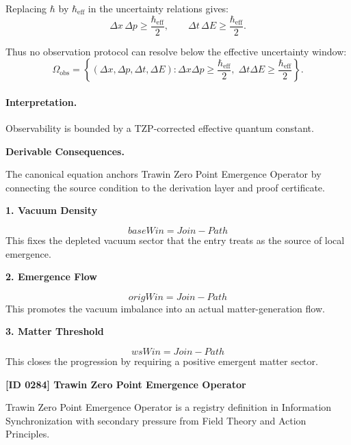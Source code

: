 Replacing $\hbar$ by $\hbar_{\mathrm{eff}}$ in the uncertainty relations gives:
\begin{equation}
\Delta x\,\Delta p
\geq
\frac{\hbar_{\mathrm{eff}}}{2},
\qquad
\Delta t\,\Delta E
\geq
\frac{\hbar_{\mathrm{eff}}}{2}.
\end{equation}

Thus no observation protocol can resolve below the effective uncertainty window:
\begin{equation}
\boxed{
\Omega_{\mathrm{obs}}
=
\left\{
(\Delta x,\Delta p,\Delta t,\Delta E):
\Delta x\Delta p\geq \frac{\hbar_{\mathrm{eff}}}{2},
\;
\Delta t\Delta E\geq \frac{\hbar_{\mathrm{eff}}}{2}
\right\}.
}
\end{equation}

\paragraph{Interpretation.}
Observability is bounded by a TZP-corrected effective quantum constant.

\par\vspace{0.35em}
\noindent\textbf{Derivable Consequences.}\quad
\begingroup
\footnotesize
\raggedright
The canonical equation anchors Trawin Zero Point Emergence Operator by connecting the source condition to the derivation layer and proof certificate.
\par\endgroup

\noindent\textbf{1. Vacuum Density}\par
\[
baseWin = Join-Path
\]
\noindent This fixes the depleted vacuum sector that the entry treats as the source of local emergence.\par
\noindent\textbf{2. Emergence Flow}\par
\[
origWin = Join-Path
\]
\noindent This promotes the vacuum imbalance into an actual matter-generation flow.\par
\noindent\textbf{3. Matter Threshold}\par
\[
wsWin = Join-Path
\]
\noindent This closes the progression by requiring a positive emergent matter sector.\par

\clearpage
\noindent\textbf{[ID 0284] Trawin Zero Point Emergence Operator}\par
\vspace{0.35em}
\begingroup\small
{}
Trawin Zero Point Emergence Operator is a registry definition in Information Synchronization with secondary pressure from Field Theory and Action Principles.

